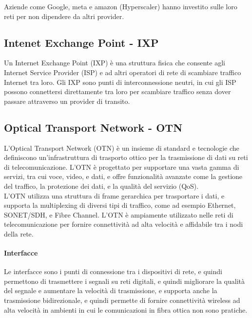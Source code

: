 Aziende come Google, meta e amazon (Hyperscaler) hanno investito sulle loro reti per non dipendere da altri provider.\\

\subsection{Intenet Exchange Point - IXP}
Un Internet Exchange Point (IXP) è una struttura fisica che consente agli Internet Service Provider (ISP) e ad altri operatori di rete di scambiare traffico Internet tra loro. Gli IXP sono punti di interconnessione neutri, in cui gli ISP possono connettersi direttamente tra loro per scambiare traffico senza dover passare attraverso un provider di transito.\\

\subsection{Optical Transport Network - OTN}
L'Optical Transport Network (OTN) è un insieme di standard e tecnologie che definiscono un'infrastruttura di trasporto ottico per la trasmissione di dati su reti di telecomunicazione. L'OTN è progettato per supportare una vasta gamma di servizi, tra cui voce, video, e dati, e offre funzionalità avanzate come la gestione del traffico, la protezione dei dati, e la qualità del servizio (QoS).\\
L'OTN utilizza una struttura di frame gerarchica per trasportare i dati, e supporta la multiplexing di diversi tipi di traffico, come ad esempio Ethernet, SONET/SDH, e Fibre Channel. L'OTN è ampiamente utilizzato nelle reti di telecomunicazione per fornire connettività ad alta velocità e affidabile tra i nodi della rete.\\

\paragraph{Interfacce}
Le interfacce sono i punti di connessione tra i dispositivi di rete, e quindi permettono di trasmettere i segnali su reti digitali, e quindi migliorare la qualità del segnale e aumentare la velocità di trasmissione, e supporta anche la trasmissione bidirezionale, e quindi permette di fornire connettività wireless ad alta velocità in ambienti in cui le comunicazioni in fibra ottica non sono pratiche.\\


